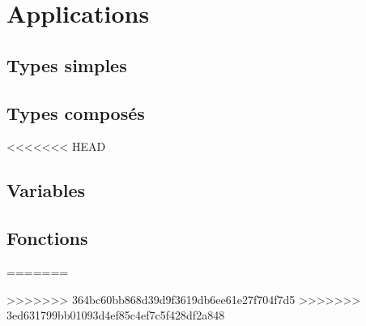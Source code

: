 % 
% 
% 
% 
% 
% 
% 
% 
% 
% 
% 
\section{Applications}
\subsection{Types simples}
\setcounter{thequestion}{0}

\subsection{Types composés}
\setcounter{thequestion}{0}
<<<<<<< HEAD

\subsection{Variables}
\setcounter{thequestion}{0}

\subsection{Fonctions}
\setcounter{thequestion}{0}

=======

>>>>>>> 364bc60bb868d39d9f3619db6ee61e27f704f7d5
>>>>>>> 3ed631799bb01093d4ef85c4ef7c5f428df2a848
